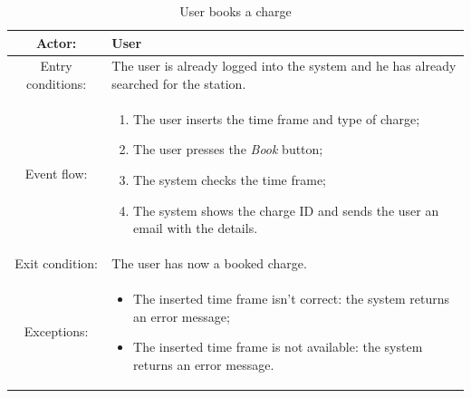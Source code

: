 \begin{table}[h]
    \begin{center}
        \begin{tabular}{|c||p{10cm}|}
            \hline
            Actor:            & User                                                                                    \\
            \hline
            Entry conditions: & The user is already logged into the system and he has already searched for the station. \\
            \hline
            Event flow:       &
            \begin{enumerate}
                \item The user inserts the time frame and type of charge;
                \item The user presses the \textit{Book} button;
                \item The system checks the time frame;
                \item The system shows the charge ID and sends the user an email with the details.
            \end{enumerate}
            \\
            \hline
            Exit condition:   & The user has now a booked charge.                                                       \\
            \hline
            Exceptions:       &
            \begin{itemize}
                \item The inserted time frame isn't correct: the system returns an error message;
                \item The inserted time frame is not available: the system returns an error message.
            \end{itemize}
            \\
            \hline
        \end{tabular}
    \end{center}
    \caption{User books a charge}
\end{table}

